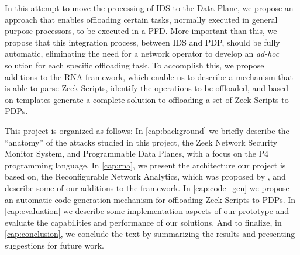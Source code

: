 In this attempt to move the processing of IDS to the Data Plane, we propose an approach that enables offloading certain tasks, normally executed in general purpose processors, to be executed in a PFD. More important than this, we propose that this integration process, between IDS and PDP, should be fully automatic, eliminating the need for a network operator to develop an \textit{ad-hoc} solution for each specific offloading task. To accomplish this, we propose additions to the RNA framework, which enable us to describe a mechanism that is able to parse Zeek Scripts, identify the operations to be offloaded, and based on templates generate a complete solution to offloading a set of Zeek Scripts to PDPs.


This project is organized as follows: In \autoref{cap:background} we briefly describe the ``anatomy'' of the attacks studied in this project, the Zeek Network Security Monitor System, and Programmable Data Planes, with a focus on the P4 programming language. In \autoref{cap:rna}, we present the architecture our project is based on, the Reconfigurable Network Analytics, which was proposed by , and describe some of our additions to the framework. In \autoref{cap:code_gen} we propose an automatic code generation mechanism for offloading Zeek Scripts to PDPs. In \autoref{cap:evaluation} we describe some implementation aspects of our prototype and evaluate the capabilities and performance of our solutions. And to finalize, in \autoref{cap:conclusion}, we conclude the text by summarizing the results and presenting suggestions for future work.













